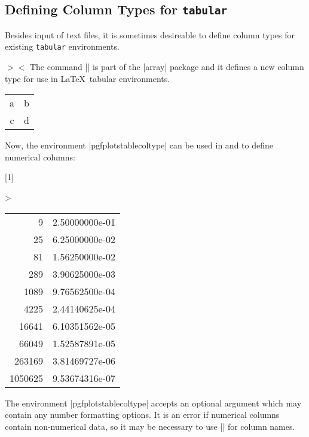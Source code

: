 \subsection{Defining Column Types for \texttt{tabular}}
Besides input of text files, it is sometimes desireable to define column types for existing \texttt{tabular} environments.

\begin{command}{\newcolumntype{}$>$$<$}
The command |\newcolumntype| is part of the |array| package and it defines a new column type  for use in \LaTeX\ tabular environments.
\begin{codeexample}
\usepackage{array}
\end{codeexample}

\begin{codeexample}[]
\begin{tabular}{dl}
a & b \\
c & d \\
\end{tabular}
\end{codeexample}

Now, the environment |pgfplotstablecoltype| can be used in  and  to define numerical columns:
\begin{codeexample}[]
\newcolumntype{L}[1]
	{>{\begin{pgfplotstablecoltype}[#1]}r<{\end{pgfplotstablecoltype}}}

\begin{tabular}{L{int detect}L{sci,sci subscript,sci zerofill}}
9      & 2.50000000e-01\\
25     & 6.25000000e-02\\
81     & 1.56250000e-02\\
289    & 3.90625000e-03\\
1089   & 9.76562500e-04\\
4225   & 2.44140625e-04\\
16641  & 6.10351562e-05\\
66049  & 1.52587891e-05\\
263169 & 3.81469727e-06\\
1050625& 9.53674316e-07\\
\end{tabular}
\end{codeexample}
\noindent The environment |pgfplotstablecoltype| accepts an optional argument which may contain any number formatting options. It is an error if numerical columns contain non-numerical data, so it may be necessary to use |\multicolumn| for column names.


\end{command}
